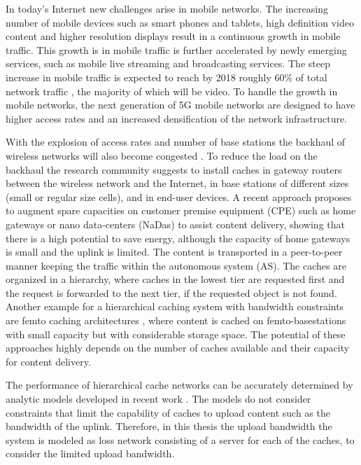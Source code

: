 In today's Internet new challenges arise in mobile networks.
The increasing number of mobile devices such as smart phones and tablets, high definition video content and higher resolution displays result in a continuous growth in mobile traffic.
This growth is in mobile traffic is further accelerated by newly emerging services, such as mobile live streaming and broadcasting services.
The steep increase in mobile traffic is expected to reach by 2018 roughly 60\% of total network traffic \cite{cisco2016}, the majority of which will be video.
To handle the growth in mobile networks, the next generation of 5G mobile networks are designed to have higher access rates and an increased densification of the network infrastructure.

With the explosion of access rates and number of base stations the backhaul of wireless networks will also become congested \cite{paschos2016wireless}.
To reduce the load on the backhaul the research community suggests to install caches in gateway routers between the wireless network and the Internet, in base stations of different sizes (small or regular size cells), and in end-user devices.
A recent approach \cite{valancius2009greening} proposes to augment spare capacities on customer premise equipment (CPE) such as home gateways or nano data-centers (NaDas) to assist content delivery, showing that there is a high potential to save energy, although the capacity of home gateways is small and the uplink is limited.
The content is transported in a peer-to-peer manner keeping the traffic within the autonomous system (AS).
The caches are organized in a hierarchy, where caches in the lowest tier are requested first and the request is forwarded to the next tier, if the requested object is not found.
Another example for a hierarchical caching system with bandwidth constraints are femto caching architectures \cite{golrezaei2013femtocaching}, where content is cached on femto-basestations with small capacity but with considerable storage space.
The potential of these approaches highly depends on the number of caches available and their capacity for content delivery.

The performance of hierarchical cache networks can be accurately determined by analytic models developed in recent work \cite{che2002hierarchical, martina2014unified}.
The models do not consider constraints that limit the capability of caches to upload content such as the bandwidth of the uplink.
Therefore, in this thesis the upload bandwidth the system is modeled as loss network consisting of a server for each of the caches, to consider the limited upload bandwidth.

